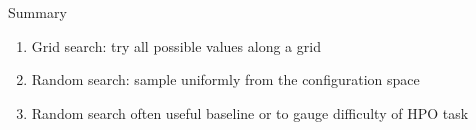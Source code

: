 \documentclass[main]{subfiles}
\begin{document}

\begin{frame}{Summary} 
\begin{enumerate}
    \item Grid search: try all possible values along a grid
    \item Random search: sample uniformly from the configuration space
    \item Random search often useful baseline or to gauge difficulty of HPO task
\end{enumerate}
\end{frame}
\end{document}
